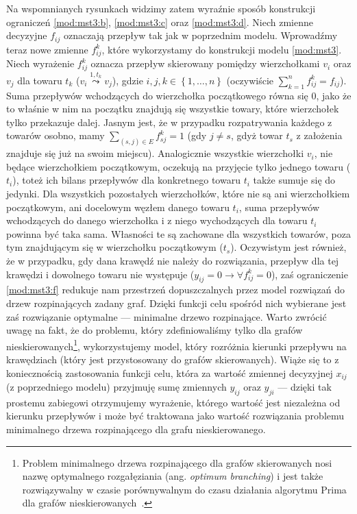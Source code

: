 Na wspomnianych rysunkach widzimy zatem wyraźnie sposób konstrukcji ograniczeń \ref{mod:mst3:b}, \ref{mod:mst3:c} oraz \ref{mod:mst3:d}. Niech zmienne decyzyjne $f_{ij}$ oznaczają przepływ tak jak w poprzednim modelu. Wprowadźmy teraz nowe zmienne $f_{ij}^{k}$, które wykorzystamy do konstrukcji modelu \ref{mod:mst3}. Niech wyrażenie $f_{ij}^{k}$ oznacza przepływ skierowany pomiędzy wierzchołkami $v_{i}$ oraz $v_{j}$ dla towaru $t_{k}$ ($v_{i} \overset{1, t_{k}}{\leadsto} v_{j}$), gdzie $i, j, k \in \left\{ 1, \dots, n \right\}$ (oczywiście $\sum_{k=1}^{n} f_{ij}^{k} = f_{ij}$). Suma przepływów wchodzących do wierzchołka początkowego równa się $0$, jako że to właśnie w nim na początku znajdują się wszystkie towary, które wierzchołek tylko przekazuje dalej. Jasnym jest, że w przypadku rozpatrywania każdego z towarów osobno, mamy $\sum_{\left( s, j \right ) \in E} f^{k}_{sj} = 1$ (gdy $j \neq s$, gdyż towar $t_{s}$ z założenia znajduje się już na swoim miejscu). Analogicznie wszystkie wierzchołki $v_{i}$, nie będące wierzchołkiem początkowym, oczekują na przyjęcie tylko jednego towaru ($t_{i}$), toteż ich bilans przepływów dla konkretnego towaru $t_{i}$ także sumuje się do jedynki. Dla wszystkich pozostałych wierzchołków, które nie są ani wierzchołkiem początkowym, ani docelowym węzłem danego towaru $t_{i}$, suma przepływów wchodzących do danego wierzchołka i z niego wychodzących dla towaru $t_{i}$ powinna być taka sama. Własności te są zachowane dla wszystkich towarów, poza tym znajdującym się w wierzchołku początkowym ($t_{s}$). Oczywistym jest również, że w przypadku, gdy dana krawędź nie należy do rozwiązania, przepływ dla tej krawędzi i dowolnego towaru nie występuje ($y_{ij} = 0 \rightarrow \forall f_{ij}^{k} = 0$), zaś ograniczenie \ref{mod:mst3:f} redukuje nam przestrzeń dopuszczalnych przez model rozwiązań do drzew rozpinających zadany graf. Dzięki funkcji celu spośród nich wybierane jest zaś rozwiązanie optymalne --- minimalne drzewo rozpinające. Warto zwrócić uwagę na fakt, że do problemu, który zdefiniowaliśmy tylko dla grafów nieskierowanych\footnote{Problem minimalnego drzewa rozpinającego dla grafów skierowanych nosi nazwę optymalnego rozgałęziania (ang. \textit{optimum branching}) i jest także rozwiązywalny w czasie porównywalnym do czasu działania algorytmu Prima dla grafów nieskierowanych~\cite{NET:NET3230070103}.}, wykorzystujemy model, który rozróżnia kierunki przepływu na krawędziach (który jest przystosowany do grafów skierowanych). Wiąże się to z koniecznością zastosowania funkcji celu, która za wartość zmiennej decyzyjnej $x_{ij}$ (z poprzedniego modelu) przyjmuję sumę zmiennych $y_{ij}$ oraz $y_{ji}$ --- dzięki tak prostemu zabiegowi otrzymujemy wyrażenie, którego wartość jest niezależna od kierunku przepływów i może być traktowana jako wartość rozwiązania problemu minimalnego drzewa rozpinającego dla grafu nieskierowanego.

